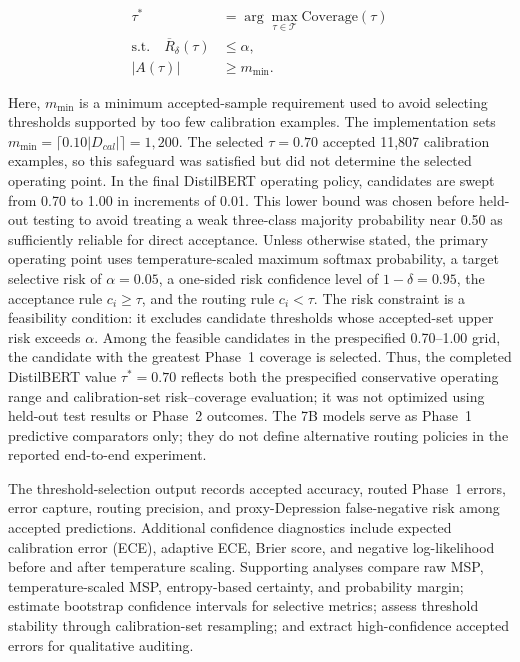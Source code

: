 \documentclass{ieeeaccess}
\begin{document}
\begin{align}
\tau^* &= \arg\max_{\tau \in \mathcal{T}}
\mathrm{Coverage}(\tau) \\
\text{s.t.}\quad
\overline{R}_{\delta}(\tau) &\leq \alpha, \\
|A(\tau)| &\geq m_{\min}.
\end{align}

Here, $m_{\min}$ is a minimum accepted-sample requirement used to avoid selecting thresholds supported by too few calibration examples. The implementation sets $m_{\min}=\lceil0.10|D_{cal}|\rceil=1{,}200$. The selected $\tau=0.70$ accepted 11,807 calibration examples, so this safeguard was satisfied but did not determine the selected operating point. In the final DistilBERT operating policy, candidates are swept from 0.70 to 1.00 in increments of 0.01. This lower bound was chosen before held-out testing to avoid treating a weak three-class majority probability near 0.50 as sufficiently reliable for direct acceptance. Unless otherwise stated, the primary operating point uses temperature-scaled maximum softmax probability, a target selective risk of $\alpha=0.05$, a one-sided risk confidence level of $1-\delta=0.95$, the acceptance rule $c_i \geq \tau$, and the routing rule $c_i < \tau$. The risk constraint is a feasibility condition: it excludes candidate thresholds whose accepted-set upper risk exceeds $\alpha$. Among the feasible candidates in the prespecified 0.70--1.00 grid, the candidate with the greatest Phase~1 coverage is selected. Thus, the completed DistilBERT value $\tau^*=0.70$ reflects both the prespecified conservative operating range and calibration-set risk--coverage evaluation; it was not optimized using held-out test results or Phase~2 outcomes. The 7B models serve as Phase~1 predictive comparators only; they do not define alternative routing policies in the reported end-to-end experiment.

The threshold-selection output records accepted accuracy, routed Phase~1 errors, error capture, routing precision, and proxy-Depression false-negative risk among accepted predictions. Additional confidence diagnostics include expected calibration error (ECE), adaptive ECE, Brier score, and negative log-likelihood before and after temperature scaling. Supporting analyses compare raw MSP, temperature-scaled MSP, entropy-based certainty, and probability margin; estimate bootstrap confidence intervals for selective metrics; assess threshold stability through calibration-set resampling; and extract high-confidence accepted errors for qualitative auditing.
\end{document}
